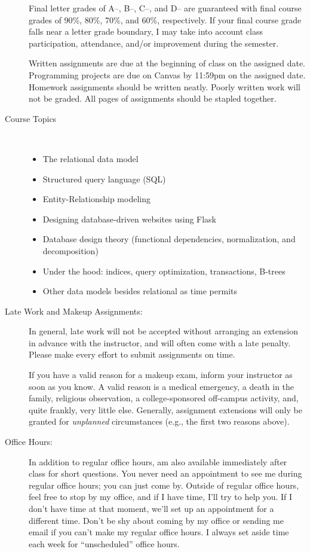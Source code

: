 \documentclass [letterpaper,11pt]{article}
\begin{document}
\begin{description}
Final letter grades of A--, B--, C--, and D-- are guaranteed with final course grades of 90\%, 80\%,
70\%, and 60\%, respectively.
If your final course grade falls near a letter grade boundary,
I may take into account class participation, attendance, and/or improvement during the semester.

Written assignments are due at the beginning of class on the assigned date. Programming
projects are due on Canvas by 11:59pm on the assigned date.  Homework assignments should be
written neatly. Poorly written work will not be graded. All pages of assignments should be
stapled together.

\item[Course Topics]\
        \begin{itemize}
                \item The relational data model
                \item Structured query language (SQL)
                \item Entity-Relationship modeling 
                \item Designing database-driven websites using Flask
                \item Database design theory (functional dependencies, normalization, and decomposition)
                \item Under the hood: indices, query optimization, transactions, B-trees
                \item Other data models besides relational as time permits
\end{itemize}

\item[Late Work and Makeup Assignments:]
In general, late work will not be accepted without arranging an extension in advance
with the instructor, and will often come with a late penalty.
Please make every effort to submit assignments on time.

If you have a valid reason for a makeup exam, inform your instructor
   as soon as you know.  A valid reason is a medical emergency, a death in the family, 
   religious observation, a college-sponsored off-campus activity, and, quite frankly, 
   very little else.  Generally, assignment extensions will only be granted for 
   \emph{unplanned} circumstances (e.g., the first two reasons above). 

\item[Office Hours:]
In addition to regular office hours, am also available immediately after class for 
short questions.  You never need an appointment to see me during regular office hours; you
can just come by.  Outside of regular office hours, feel free to stop by my office,
and if I have time, I'll try to help you.  If I don't have time at that moment, we'll set up an
appointment for a different time.
Don't be shy about coming by my office or sending me email
if you can't make my regular office hours.  I always set aside time each week for ``unscheduled'' office hours.


\end{description}
\end{document}
